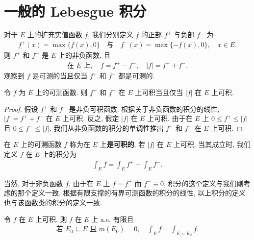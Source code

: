 \documentclass[../../main.tex]{subfiles}
\begin{document}
\section{一般的 Lebesgue 积分}\label{section:ch04-一般积分}

对于 $E$ 上的扩充实值函数 $f$, 我们分别定义 $f$ 的正部 $f^{+}$ 与负部 $f^{-}$ 为
\begin{align*}
f^{+}(x)=\max\{f(x),0\}\quad\text{与}\quad f^{-}(x)=\max\{-f(x),0\},\quad x\in E.
\end{align*}
则 $f^{+}$ 和 $f^{-}$ 是 $E$ 上的非负函数, 且
\begin{align*}
\text{在 }E\text{ 上},\quad f=f^{+}-f^{-},\quad |f|=f^{+}+f^{-}.
\end{align*}
观察到 $f$ 是可测的当且仅当 $f^{+}$ 和 $f^{-}$ 都是可测的.

\begin{proposition}\label{proposition:ch04-正负部可积}
令 $f$ 为 $E$ 上的可测函数. 则 $f^{+}$ 和 $f^{-}$ 在 $E$ 上可积当且仅当 $|f|$ 在 $E$ 上可积.
\end{proposition}

\begin{proof}
假设 $f^{+}$ 和 $f^{-}$ 是非负可积函数. 根据关于非负函数的积分的线性, $|f|=f^{+}+f^{-}$ 在 $E$ 上可积. 反之, 假定 $|f|$ 在 $E$ 上可积. 由于在 $E$ 上 $0\leqslant f^{+}\leqslant|f|$ 且 $0\leqslant f^{-}\leqslant|f|$, 我们从非负函数的积分的单调性推出 $f^{+}$ 和 $f^{-}$ 在 $E$ 上可积.
\end{proof}

\begin{definition}\label{definition:ch04-可积}
在 $E$ 上的可测函数 $f$ 称为在 $E$ 上\textbf{是可积的}, 若 $|f|$ 在 $E$ 上可积. 当其成立时, 我们定义 $f$ 在 $E$ 上的积分为
\begin{align*}
\int_{E}f=\int_{E}f^{+}-\int_{E}f^{-}.
\end{align*}
\end{definition}

当然, 对于非负函数 $f$, 由于在 $E$ 上 $f=f^{+}$ 而 $f^{-}\equiv 0$, 积分的这个定义与我们刚考虑的那个定义一致. 根据有限支撑的有界可测函数的积分的线性, 以上积分的定义也与该函数类的积分的定义一致.

\begin{proposition}\label{proposition:ch04-可积a.e.有限}
令 $f$ 在 $E$ 上可积. 则 $f$ 在 $E$ 上 a.e. 有限且
\begin{align}
\text{若 }E_{0}\subseteq E\text{ 且 }m(E_{0})=0,\quad\int_{E}f=\int_{E\sim E_{0}}f.\label{align:ch04-可积零测}
\end{align}
\end{proposition}
\end{document}
